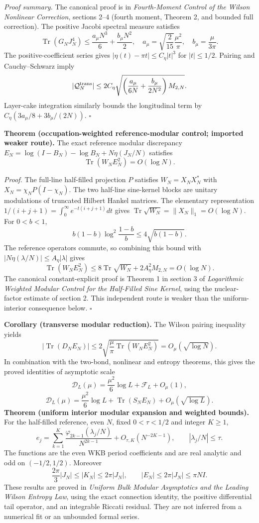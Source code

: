 \documentclass[
  10pt,
  a4paper,
]{article}
\begin{document}
\emph{Proof summary.} The canonical proof is in \emph{Fourth-Moment Control of the Wilson Nonlinear Correction}, sections 2--4 (fourth moment, Theorem 2, and bounded full correction). The positive Jacobi spectral measure satisfies \[
\operatorname{Tr}(G_NJ_N^4)\le\frac{a_\mu N^3}{6}+\frac{b_\mu N^2}{2},\quad
 a_\mu=\sqrt{\frac2{15}}\frac{\mu^2}{\pi},\quad b_\mu=\frac\mu{3\pi}.
\] The positive-coefficient series gives \(|\eta(t)-\pi t|\le C_\eta|t|^3\) for \(|t|\le1/2\). Pairing and Cauchy--Schwarz imply \[
|\mathcal Q_N^{\rm trans}|\le
2C_\eta\sqrt{\left(\frac{a_\mu}{6N}+\frac{b_\mu}{2N^2}\right)M_{2,N}}.
\] Layer-cake integration similarly bounds the longitudinal term by \(C_\eta(3a_\mu/8+3b_\mu/(2N))\). \(\square\)

\textbf{Theorem (occupation-weighted reference-modular control; imported weaker route).} The exact reference modular discrepancy \(E_N=\log(I-B_N)-\log B_N+N\eta(J_N/N)\) satisfies \[
\boxed{\operatorname{Tr}(W_NE_N^2)=O(\log N).}
\]

\emph{Proof.} The full-line half-filled projection \(P\) satisfies \(W_N=X_NX_N^*\) with \(X_N=\chi_NP(I-\chi_N)\). The two half-line sine-kernel blocks are unitary modulations of truncated Hilbert Hankel matrices. The elementary representation \(1/(i+j+1)=\int_0^\infty e^{-t(i+j+1)}dt\) gives \(\operatorname{Tr}\sqrt{W_N}=\|X_N\|_1=O(\log N)\). For \(0<b<1\), \[
b(1-b)\log^2\frac{1-b}b\le4\sqrt{b(1-b)}.
\] The reference operators commute, so combining this bound with \(|N\eta(\lambda/N)|\le A_\eta|\lambda|\) gives \[
\operatorname{Tr}(W_NE_N^2)
\le8\operatorname{Tr}\sqrt{W_N}+2A_\eta^2M_{2,N}=O(\log N).
\] The canonical constant-explicit proof is Theorem 1 in section 3 of \emph{Logarithmic Weighted Modular Control for the Half-Filled Sine Kernel}, using the nuclear-factor estimate of section 2. This independent route is weaker than the uniform-interior consequence below. \(\square\)

\textbf{Corollary (transverse modular reduction).} The Wilson pairing inequality yields \[
|\operatorname{Tr}(D_NE_N)|\le
2\sqrt{\frac\mu\pi\operatorname{Tr}(W_NE_N^2)}
=O_\mu(\sqrt{\log N}).
\] In combination with the two-bond, nonlinear and entropy theorems, this gives the proved identities of asymptotic scale \[
\boxed{\mathcal D_L(\mu)=\frac{\mu^2}{6}\log L+\mathcal F_L+O_\mu(1),}
\] \[
\boxed{\mathcal D_L(\mu)=\frac{\mu^2}{6}\log L+\operatorname{Tr}(S_NE_N)
+O_\mu(\sqrt{\log L}).}
\] \textbf{Theorem (uniform interior modular expansion and weighted bounds).} For the half-filled reference, even \(N\), fixed \(0<\tau<1/2\) and integer \(K\ge1\), \[
e_j=\sum_{k=1}^K\frac{\varphi_{2k-1}(\lambda_j/N)}{N^{2k-1}}
+O_{\tau,K}(N^{-2K-1}),\qquad |\lambda_j/N|\le\tau.
\] The functions are the even WKB period coefficients and are real analytic and odd on \((-1/2,1/2)\). Moreover \[
\frac{2\pi}{3}|J_N|\le|K_N|\le2\pi|J_N|,\qquad
|E_N|\le2\pi|J_N|\le\pi N I.
\] These results are proved in \emph{Uniform Bulk Modular Asymptotics and the Leading Wilson Entropy Law}, using the exact connection identity, the positive differential tail operator, and an integrable Riccati residual. They are not inferred from a numerical fit or an unbounded formal series.
\end{document}
